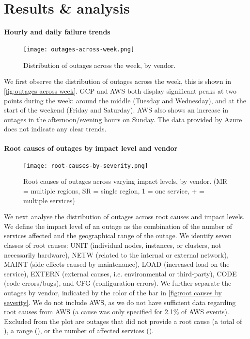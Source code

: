 \section{Results \& analysis}

\paragraph{Hourly and daily failure trends}
\begin{figure}[h]
  \centering
  \texttt{[image: outages-across-week.png]}
  \caption{Distribution of outages across the week, by vendor.}
  \label{fig:outages across week}
\end{figure}

We first observe the distribution of outages across the week, this is shown in \autoref{fig:outages across week}.
GCP and AWS both display significant peaks at two points during the week: around the middle (Tuesday and Wednesday), and at the start of the weekend (Friday and Saturday).
AWS also shows an increase in outages in the afternoon/evening hours on Sunday.
The data provided by Azure does not indicate any clear trends.

\paragraph{Root causes of outages by impact level and vendor}
\begin{figure}
  \centering
  \texttt{[image: root-causes-by-severity.png]}
  \caption{Root causes of outages across varying impact levels, by vendor. (MR = multiple regions, SR = single region, 1 = one service, + = multiple services)}
  \label{fig:root causes by severity}
\end{figure}

We next analyse the distribution of outages across root causes and impact levels.
We define the impact level of an outage as the combination of the number of services affected and the geographical range of the outage.
We identify seven classes of root causes: UNIT (individual nodes, instances, or clusters, not necessarily hardware), NETW (related to the internal or external network), MAINT (side effects caused by maintenance), LOAD (increased load on the service), EXTERN (external causes, i.e. environmental or third-party), CODE (code errors/bugs), and CFG (configuration errors).
We further separate the outages by vendor, indicated by the color of the bar in \autoref{fig:root causes by severity}.
We do not include AWS, as we do not have sufficient data regarding root causes from AWS (a cause was only specified for 2.1\% of AWS events).
Excluded from the plot are outages that did not provide a root cause (a total of ), a range (), or the number of affected services ().

